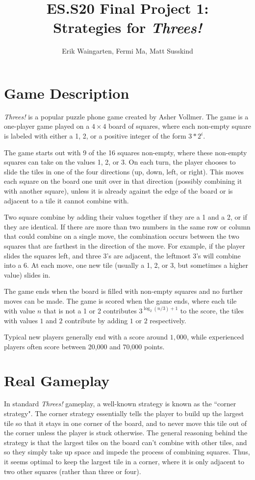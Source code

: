 \documentclass[11pt]{article}
\author{Erik Waingarten, Fermi Ma, Matt Susskind}
\title{ES.S20 Final Project 1: \\
Strategies for \emph{Threes!}}
\begin{document}
         
\maketitle

\section{Game Description}

\emph{Threes!} is a popular puzzle phone game created by Asher Vollmer. The game is a one-player game played on a $4 \times 4$ board of squares, where each non-empty square is labeled with either a 1, 2, or a positive integer of the form $3*2^i$.

The game starts out with 9 of the 16 squares non-empty, where these non-empty squares can take on the values 1, 2, or 3. On each turn, the player chooses to slide the tiles in one of the four directions (up, down, left, or right). This moves each square on the board one unit over in that direction (possibly combining it with another square), unless it is already against the edge of the board or is adjacent to a tile it cannot combine with.

Two square combine by adding their values together if they are a 1 and a 2, or if they are identical. If there are more than two numbers in the same row or column that could combine on a single move, the combination occurs between the two squares that are farthest in the direction of the move. For example, if the player slides the squares left, and three 3's are adjacent, the leftmost 3's will combine into a 6. At each move, one new tile (usually a 1, 2, or 3, but sometimes a higher value) slides in.

The game ends when the board is filled with non-empty squares and no further moves can be made. The game is scored when the game ends, where each tile with value $n$ that is not a 1 or 2 contributes $3^{\log_2(n/3)+1}$ to the score, the tiles with values $1$ and $2$ contribute by adding $1$ or $2$ respectively.

Typical new players generally end with a score around $1,000$, while experienced players often score between 20,000 and 70,000 points.

\section{Real Gameplay}

In standard \emph{Threes!} gameplay, a well-known strategy is known as the ``corner strategy". The corner strategy essentially tells the player to build up the largest tile so that it stays in one corner of the board, and to never move this tile out of the corner unless the player is stuck otherwise. The general reasoning behind the strategy is that the largest tiles on the board can't combine with other tiles, and so they simply take up space and impede the process of combining squares. Thus, it seems optimal to keep the largest tile in a corner, where it is only adjacent to two other squares (rather than three or four).
\end{document}
